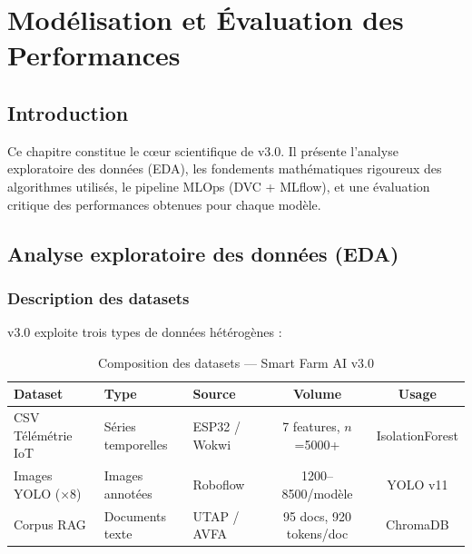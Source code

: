 \chapter{Modélisation et Évaluation des Performances}
\thispagestyle{fancy}

\section{Introduction}

Ce chapitre constitue le cœur scientifique de \farmAI{} v3.0. Il présente l'analyse
exploratoire des données (EDA), les fondements mathématiques rigoureux des algorithmes
utilisés, le pipeline MLOps (DVC + MLflow), et une évaluation critique des performances
obtenues pour chaque modèle.

\section{Analyse exploratoire des données (EDA)}

\subsection{Description des datasets}

\farmAI{} v3.0 exploite trois types de données hétérogènes :

\begin{table}[H]\centering
\caption{Composition des datasets — Smart Farm AI v3.0}
\label{tab:datasets}
\small
\begin{tabular}{lllcc}
\toprule
\textbf{Dataset} & \textbf{Type} & \textbf{Source} & \textbf{Volume} & \textbf{Usage} \\
\midrule
CSV Télémétrie IoT  & Séries temporelles & ESP32 / Wokwi    & 7 features, $n$=5000+ & IsolationForest \\
Images YOLO (×8)    & Images annotées    & Roboflow         & 1200--8500/modèle     & YOLO v11 \\
Corpus RAG          & Documents texte    & UTAP / AVFA      & 95 docs, 920 tokens/doc & ChromaDB \\
\bottomrule
\end{tabular}
\end{table}

